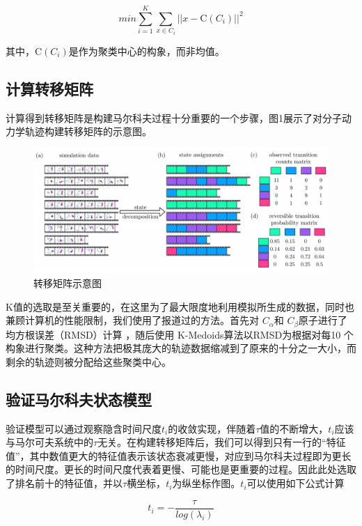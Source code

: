 \documentclass[a4paper]{article}
\begin{document}
\begin{CJK}{UTF8}{gbsn}
\begin{equation}
min\sum_{i=1}^{K}\sum_{x\in C_{i}}^{} {\vert\vert x- \mathrm C(C_{i}) \vert\vert}^{2}
\end{equation}


其中，$\mathrm C(C_{i})$是作为聚类中心的构象，而非均值。


	\subsection{计算转移矩阵}
计算得到转移矩阵是构建马尔科夫过程十分重要的一个步骤，图1展示了对分子动力学轨迹构建转移矩阵的示意图。

\begin{figure}[H]
\centering
\includegraphics[scale=0.35]{trans_matrix.png}
\caption{转移矩阵示意图}
\end{figure}

K值的选取是至关重要的，在这里为了最大限度地利用模拟所生成的数据，同时也兼顾计算机的性能限制，我们使用了报道过的方法。首先对 $C_{\alpha} $和 $C_{\beta}$原子进行了均方根误差（RMSD）计算 ，随后使用 K-Medoids算法以RMSD为根据对每10 个构象进行聚类。这种方法把极其庞大的轨迹数据缩减到了原来的十分之一大小，而剩余的轨迹则被分配给这些聚类中心。

	\subsection{验证马尔科夫状态模型}

验证模型可以通过观察隐含时间尺度$t_{i}$的收敛实现，伴随着$\tau$值的不断增大，$t_{i}$应该与马尔可夫系统中的$\tau$无关。在构建转移矩阵后，我们可以得到只有一行的“特征值”，其中数值更大的特征值表示该状态衰减更慢，对应到马尔科夫过程即为更长的时间尺度。更长的时间尺度代表着更慢、可能也是更重要的过程。因此此处选取了排名前十的特征值，并以$\tau$横坐标，$t_{i}$为纵坐标作图。$t_{i}$可以使用如下公式计算


\begin{equation}
t_{i} = -\frac{\tau}{log(\lambda_{i})}
\end{equation}


\end{CJK}
\end{document}
